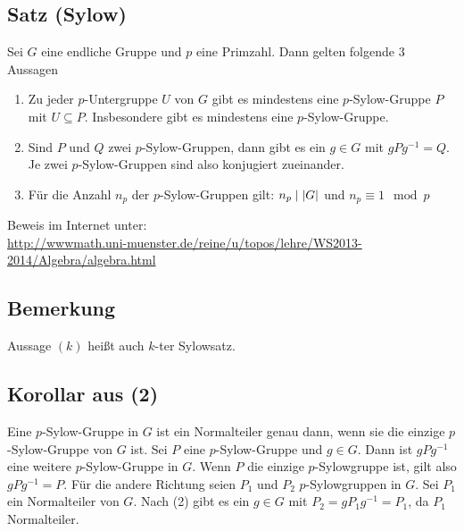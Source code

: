 \subsection{Satz (Sylow)} %
\label{sub:44}
Sei $G$ eine endliche Gruppe und $p$ eine Primzahl. Dann gelten folgende 3 Aussagen
\begin{enumerate}[(1)]
	\item Zu jeder $p$-Untergruppe $U$ von $G$ gibt es mindestens eine $p$-Sylow-Gruppe $P$ mit $U \subseteq P$. Insbesondere gibt es mindestens eine $p$-Sylow-Gruppe.
	\item Sind $P$ und $Q$ zwei $p$-Sylow-Gruppen, dann gibt es ein $g \in G$ mit $g P g ^{-1} =Q$. Je zwei $p$-Sylow-Gruppen sind also konjugiert zueinander.
	\item Für die Anzahl $n_p$ der $p$-Sylow-Gruppen gilt: $n_p \mid \lvert G\rvert $ und $n_p \equiv 1 \mod p$
\end{enumerate}
Beweis im Internet unter: \\ \url{http://wwwmath.uni-muenster.de/reine/u/topos/lehre/WS2013-2014/Algebra/algebra.html}

\subsection[Bemerkung zur Bezeichnung der Sylow-Sätze]{Bemerkung} %
\label{sub:45}
Aussage $(k)$ heißt auch $k$-ter Sylowsatz.

\subsection[Korollar: Eine $p$-Sylowgruppen ist Normalteiler gdw. sie die einzige $p$-Sylowgruppe ist]{Korollar aus (2)} %
\label{sub:46}
Eine $p$-Sylow-Gruppe in $G$ ist ein Normalteiler genau dann, wenn sie die einzige $p$-Sylow-Gruppe von $G$ ist.
Sei $P$ eine $p$-Sylow-Gruppe und $g \in G$. Dann ist $g P g ^{-1}$ eine weitere $p$-Sylow-Gruppe in $G$. Wenn $P$ die einzige $p$-Sylowgruppe ist, gilt also $gP g ^{-1}=P$.
Für die andere Richtung seien $P_1$ und $P_2$ $p$-Sylowgruppen in $G$. Sei $P_1$ ein Normalteiler von $G$. Nach (2) gibt es ein $g \in G$ mit $P_2 = g P_1 g ^{-1} = P_1$, 
da $P_1$ Normalteiler. \bewende 

